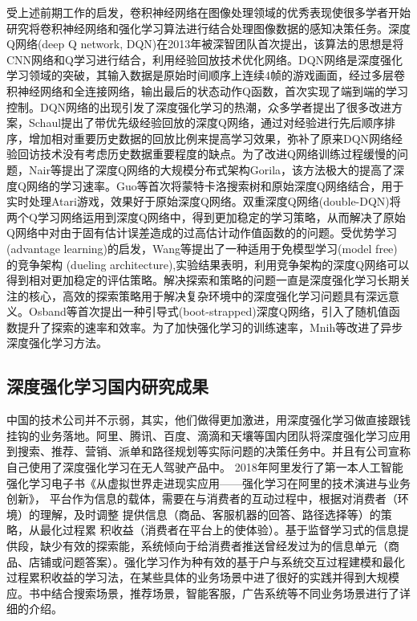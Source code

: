 受上述前期工作的启发，卷积神经网络在图像处理领域的优秀表现使很多学者开始研究将卷积神经网络和强化学习算法进行结合处理图像数据的感知决策任务。深度Q网络(deep Q network, DQN)\cite{Mnih2013Playing}在2013年被深智团队首次提出，该算法的思想是将CNN网络和Q学习进行结合，利用经验回放技术优化网络。DQN网络是深度强化学习领域的突破，其输入数据是原始时间顺序上连续4帧的游戏画面，经过多层卷积神经网络和全连接网络，输出最后的状态动作Q函数，首次实现了端到端的学习控制。DQN网络的出现引发了深度强化学习的热潮，众多学者提出了很多改进方案，Schaul提出了带优先级经验回放的深度Q网络\cite{Schaul2015Prioritized}，通过对经验进行先后顺序排序，增加相对重要历史数据的回放比例来提高学习效果，弥补了原来DQN网络经验回访技术没有考虑历史数据重要程度的缺点。为了改进Q网络训练过程缓慢的问题，Nair等提出了深度Q网络的大规模分布式架构Gorila\cite{Goeringer2013Massively}，该方法极大的提高了深度Q网络的学习速率。Guo等首次将蒙特卡洛搜索树和原始深度Q网络结合\cite{Guo2014Deep}，用于实时处理Atari游戏，效果好于原始深度Q网络。双重深度Q网络(double-DQN)\cite{DQN}将两个Q学习网络运用到深度Q网络中，得到更加稳定的学习策略，从而解决了原始Q网络中对由于固有估计误差造成的过高估计动作值函数的的问题。受优势学习(advantage learning)的启发，Wang等提出了一种适用于免模型学习(model free) 的竞争架构 (dueling architecture),实验结果表明，利用竞争架构的深度Q网络可以得到相对更加稳定的评估策略。解决探索和策略的问题一直是深度强化学习长期关注的核心，高效的探索策略用于解决复杂环境中的深度强化学习问题具有深远意义。Osband等首次提出一种引导式(boot-strapped)深度Q网络\cite{Osband2016Deep}，引入了随机值函数提升了探索的速率和效率。为了加快强化学习的训练速率，Mnih等改进了异步深度强化学习方法\cite{Mnih2016Asynchronous}。
\subsection{深度强化学习国内研究成果}
中国的技术公司并不示弱，其实，他们做得更加激进，用深度强化学习做直接跟钱挂钩的业务落地。阿里、腾讯、百度、滴滴和天壤等国内团队将深度强化学习应用到搜索、推荐、营销、派单和路径规划等实际问题的决策任务中。并且有公司宣称自己使用了深度强化学习在无人驾驶产品中。
2018年阿里发行了第一本人工智能强化学习电子书\raisebox{0.3mm}{----}《从虚拟世界走进现实应用——强化学习在阿里的技术演进与业务创新》， 平台作为信息的载体，需要在与消费者的互动过程中，根据对消费者（环境）的理解，及时调整 提供信息（商品、客服机器的回答、路径选择等）的策略，从最化过程累 积收益（消费者在平台上的使体验）。基于监督学习式的信息提供段，缺少有效的探索能，系统倾向于给消费者推送曾经发过为的信息单元（商品、店铺或问题答案）。强化学习作为种有效的基于户与系统交互过程建模和最化过程累积收益的学习法，在某些具体的业务场景中进了很好的实践并得到大规模应。书中结合搜索场景，推荐场景，智能客服，广告系统等不同业务场景进行了详细的介绍。

